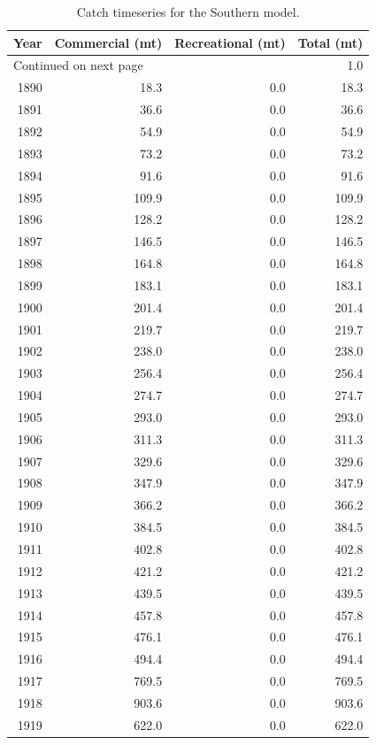 \documentclass[12pt,]{article}
\begin{document}
\begin{longtable}{rrrr}
\caption{Catch timeseries for the Southern model.} \\ 
  \hline
Year & Commercial (mt) & Recreational (mt) & Total (mt) \\ 
  \hline 
\endhead 
\hline 
\multicolumn{3}{l}{\footnotesize Continued on next page} 
\endfoot 
\endlastfoot 
 \hline
1889 & 1.0 & 0.0 & 1.0 \\ 
  1890 & 18.3 & 0.0 & 18.3 \\ 
  1891 & 36.6 & 0.0 & 36.6 \\ 
  1892 & 54.9 & 0.0 & 54.9 \\ 
  1893 & 73.2 & 0.0 & 73.2 \\ 
  1894 & 91.6 & 0.0 & 91.6 \\ 
  1895 & 109.9 & 0.0 & 109.9 \\ 
  1896 & 128.2 & 0.0 & 128.2 \\ 
  1897 & 146.5 & 0.0 & 146.5 \\ 
  1898 & 164.8 & 0.0 & 164.8 \\ 
  1899 & 183.1 & 0.0 & 183.1 \\ 
  1900 & 201.4 & 0.0 & 201.4 \\ 
  1901 & 219.7 & 0.0 & 219.7 \\ 
  1902 & 238.0 & 0.0 & 238.0 \\ 
  1903 & 256.4 & 0.0 & 256.4 \\ 
  1904 & 274.7 & 0.0 & 274.7 \\ 
  1905 & 293.0 & 0.0 & 293.0 \\ 
  1906 & 311.3 & 0.0 & 311.3 \\ 
  1907 & 329.6 & 0.0 & 329.6 \\ 
  1908 & 347.9 & 0.0 & 347.9 \\ 
  1909 & 366.2 & 0.0 & 366.2 \\ 
  1910 & 384.5 & 0.0 & 384.5 \\ 
  1911 & 402.8 & 0.0 & 402.8 \\ 
  1912 & 421.2 & 0.0 & 421.2 \\ 
  1913 & 439.5 & 0.0 & 439.5 \\ 
  1914 & 457.8 & 0.0 & 457.8 \\ 
  1915 & 476.1 & 0.0 & 476.1 \\ 
  1916 & 494.4 & 0.0 & 494.4 \\ 
  1917 & 769.5 & 0.0 & 769.5 \\ 
  1918 & 903.6 & 0.0 & 903.6 \\ 
  1919 & 622.0 & 0.0 & 622.0 \\ 

\end{longtable}
\end{document}
